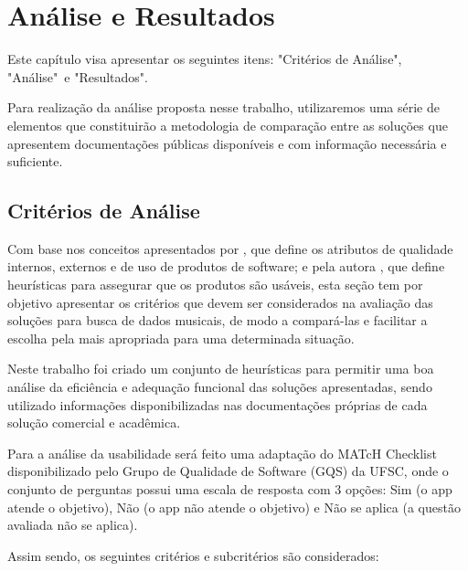 \chapter{Análise e Resultados} \label{analiseResultados}
Este capítulo visa apresentar os seguintes itens: "Critérios de Análise", "Análise"\ e "Resultados".

Para realização da análise proposta nesse trabalho, utilizaremos uma série de elementos que constituirão a metodologia de comparação entre as soluções que apresentem documentações públicas disponíveis e com informação necessária e suficiente.

\section{Critérios de Análise}

Com base nos conceitos apresentados por , que define os atributos de qualidade internos, externos e de uso de produtos de software; e pela autora , que define heurísticas para assegurar que os produtos são usáveis, esta seção tem por objetivo apresentar os critérios que devem ser considerados na avaliação das soluções para busca de dados musicais, de modo a compará-las e facilitar a escolha pela mais apropriada para uma determinada situação.

Neste trabalho foi criado um conjunto de heurísticas para permitir uma boa análise da eficiência e adequação funcional das soluções apresentadas, sendo utilizado informações disponibilizadas nas documentações próprias de cada solução comercial e acadêmica.

Para a análise da usabilidade será feito uma adaptação do MATcH Checklist disponibilizado pelo Grupo de Qualidade de Software (GQS) da UFSC, onde o conjunto de perguntas possui uma escala de resposta com 3 opções: Sim (o app atende o objetivo), Não (o app não atende o objetivo) e Não se aplica (a questão avaliada não se aplica).

Assim sendo, os seguintes critérios e subcritérios são considerados:

